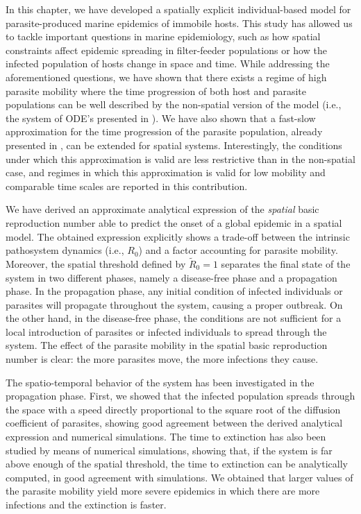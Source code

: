 In this chapter, we have developed a spatially explicit individual-based model
for parasite-produced marine epidemics of immobile hosts. This study has
allowed us to tackle important questions in marine epidemiology, such as how
spatial constraints affect epidemic spreading in filter-feeder populations or
how the infected population of hosts change in space and time. While
addressing the aforementioned questions, we have shown that there exists a
regime of high parasite mobility where the time progression of both host and
parasite populations can be well described by the non-spatial version of the
model (i.e., the system of ODE's presented in \cite{GimenezRomero2021}). We
have also shown that a fast-slow approximation for the time progression of the
parasite population, already presented in \cite{GimenezRomero2021}, can be
extended for spatial systems. Interestingly, the conditions under which this
approximation is valid	are less restrictive than in the non-spatial case, and
regimes in which this approximation is valid for low mobility and comparable
time scales are reported in this contribution.

We have derived an approximate analytical expression of the
\textit{spatial} basic reproduction number able to predict the onset of
a global epidemic in a spatial model. The obtained expression explicitly shows
a trade-off between the intrinsic pathosystem dynamics (i.e., $R_0$) and a
factor accounting for parasite mobility. Moreover, the spatial threshold
defined by $\tilde{R}_0=1$ separates the final state of the system in two
different phases, namely a disease-free phase and a propagation phase. In the
propagation phase, any initial condition of infected individuals or parasites
will propagate throughout the system, causing a proper outbreak. On the other
hand, in the disease-free phase, the conditions are not sufficient for a local
introduction of parasites or infected individuals to spread through the system.
The effect of the parasite mobility in the spatial basic reproduction number is
clear: the more parasites move, the more infections they cause.

The spatio-temporal behavior of the system has been investigated in the
propagation phase. First, we showed that the infected population spreads
through the space with a speed directly proportional to the square root of the
diffusion coefficient of parasites, showing good agreement between the derived
analytical expression and numerical simulations. The time to extinction has
also been studied by means of numerical simulations, showing that, if the
system is far above enough of the spatial threshold, the time to extinction can
be analytically computed, in good agreement with simulations. We obtained that
larger values of the parasite mobility yield more severe epidemics in which
there are more infections and the extinction is faster.

